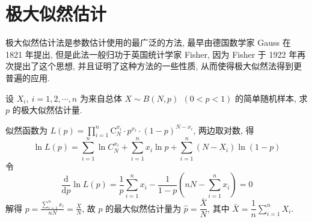 

\section{极大似然估计}

极大似然估计法是参数估计使用的最广泛的方法, 最早由德国数学家 Gauss 在 1821 年提出, 
但是此法一般归功于英国统计学家 Fisher, 因为 Fisher 于 1922 年再次提出了这个思想, 并且证明了这种方法的一些性质, 
从而使得极大似然法得到更普遍的应用.

\begin{example}
    设 $X_i,~i=1,2,\cdots,n$ 为来自总体 $X\sim B(N,p)~~(0<p<1)$ 的简单随机样本, 求 $p$ 的极大似然估计量.
\end{example}
\begin{solution}
    似然函数为 $\displaystyle L(p)=\prod_{i=1}^{n} \mathrm{C}_{N}^{x_{i}} \cdot p^{x_{i}} \cdot(1-p)^{N-x_{i}} $, 两边取对数, 得
    $$\ln L(p)=\sum_{i=1}^{n} \ln C_{N}^{x_{i}}+\sum_{i=1}^{n} x_{i} \ln p+\sum_{i=1}^{n}\left(N-X_{i}\right) \ln (1-p)$$
    令 $$\frac{\mathrm{d}}{\mathrm{d} p} \ln L(p)=\frac{1}{p} \sum_{i=1}^{n} x_{i}-\frac{1}{1-p}\left(n N-\sum_{i=1}^{n} x_{i}\right)=0$$
    解得 $\displaystyle p=\frac{\displaystyle \sum_{i=1}^{n} x_{i}}{n N}=\frac{\bar{X}}{N} $, 故 $ p $ 的最大似然估计量为 $ \hat{p}=\dfrac{\bar{X}}{N} $, 
    其中 $ \displaystyle\bar{X}=\dfrac{1}{n} \sum_{i=1}^{n} X_{i} .$
\end{solution}

